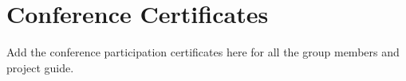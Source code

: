 \chapter{Conference Certificates}

Add the conference participation certificates here for all the group members and project guide.